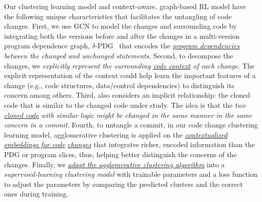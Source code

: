 Our clustering learning model and context-aware, graph-based RL model
have the following unique characteristics that facilitates the
untangling of code changes. First, we use GCN to model the changes and
surrounding code by integrating both the versions before and after the
changes in a multi-version program dependence graph,
$\delta$-PDG~\cite{flexeme-fse20} that encodes the {\em
  \underline{program dependencies} between the changed and unchanged
  statements}. Second, to decompose the changes, we {\em explicitly
  represent the surrounding \underline{code context} of each
  change}. The explicit representation of the context could help
{\tool} learn the important features of a change (e.g., code
structures, data/control dependencies) to distinguish its concern among
others.
%
Third, {\tool} also considers an implicit relationship:
the cloned code that is similar to the changed code under study.
%
The idea is that the {\em two \underline{cloned code} with similar
  logic might be changed in the same manner in the same concern in a
  commit}. Fourth, to untangle a commit, in our code change clustering
learning model, agglomerative clustering is applied on the {\em
  \underline{contextualized embeddings for code}} {\em
  \underline{changes}} that integrates richer, encoded information
than the PDG or program slices, thus, helping better distinguish the
concerns of the changes. Finally, we {\em \underline{adapt the
    agglomerative clustering algorithm}} into a {\em
  supervised-learning clustering model} with trainable parameters and
a loss function to adjust the parameters by comparing the predicted
clusters and the correct ones during training.



